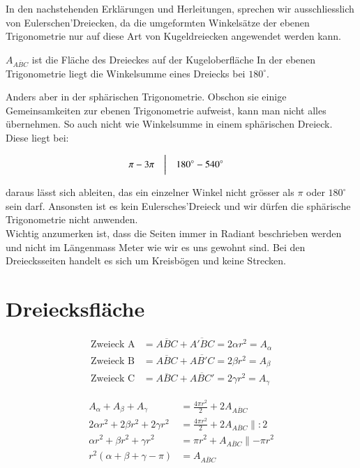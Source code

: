 \begin{refsection}
In den nachstehenden Erklärungen und Herleitungen, sprechen wir ausschliesslich von Eulerschen’Dreiecken, da die umgeformten Winkelsätze der ebenen Trigonometrie nur auf diese Art von Kugeldreiecken angewendet werden kann.

$A_{ \overline{ ABC }}$ ist die Fläche des Dreieckes auf der Kugeloberfläche
In der ebenen Trigonometrie liegt die Winkelsumme eines Dreiecks bei
$180^{\circ}$.

Anders aber in der sphärischen Trigonometrie. Obschon sie einige Gemeinsamkeiten zur ebenen Trigonometrie aufweist, kann man nicht alles übernehmen.
So auch nicht wie Winkelsumme in einem sphärischen Dreieck.
Diese liegt bei:

\[
\begin{aligned}
\pi
&-
3\pi
&
&\text{\bigg \vert}
&
180^{\circ}
&-
540^{\circ}
\end{aligned}
\]

daraus lässt sich ableiten, das ein einzelner Winkel nicht grösser als $\pi$ oder $180^{\circ}$ sein darf. Ansonsten ist es kein Eulersches’Dreieck und wir dürfen die sphärische Trigonometrie nicht anwenden.\\
Wichtig anzumerken ist, dass die Seiten immer in Radiant beschrieben werden und nicht im Längenmass Meter wie wir es uns gewohnt sind. 
Bei den Dreiecksseiten handelt es sich um Kreisbögen und keine Strecken.

\section{Dreiecksfläche}

\begin{align*}
\text{Zweieck A}
&=
\overline{ABC} + \overline{A'BC} = 2 \alpha r^{ 2 } = A_{ \alpha }\\
\text{Zweieck B}
&=
\overline{ABC} + \overline{AB'C} = 2 \beta r^{ 2 } = A_{ \beta }\\
\text{Zweieck C}
&=
\overline{ABC} + \overline{ABC'} = 2 \gamma r^{ 2 } = A_{ \gamma }
\end{align*}

\begin{align*}
A_{ \alpha } + A_{ \beta } + A_{ \gamma } &= \frac{ 4\pi r^{ 2 } }{ 2 } + 2A_{ \overline{ ABC }} \\
2\alpha r^{ 2 } + 2\beta r^{ 2 } + 2\gamma r^{ 2 } &= \frac{ 4\pi r^{ 2 } }{ 2 } + 2A_{ \overline{ ABC }} \parallel:2\\
\alpha r^{ 2 } + \beta r^{ 2 } + \gamma r^{ 2 } &= \pi r^{ 2 } + A_{ \overline{ ABC }} \parallel-\pi r^{ 2 }\\
r^{ 2 }\left(\alpha + \beta + \gamma - \pi\right) &= A_{ \overline{ ABC }}
\end{align*}





\end{refsection}
